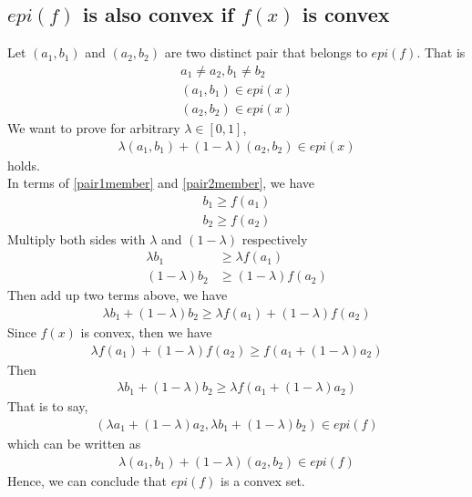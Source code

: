 \documentclass[11pt,a4paper]{article}
\begin{document}
\subsection{$epi(f)$ is also convex if $f(x)$ is convex}
Let $(a_1, b_1)$ and $(a_2, b_2)$ are two distinct pair that belongs to
$epi(f)$. That is 
\begin{align}
    a_1 \not = a_2 , b_1 \not = b_2 \\
    (a_1, b_1) \in epi(x) \label{pair1member} \\
    (a_2, b_2) \in epi(x) \label{pair2member}
\end{align}
We want to prove for arbitrary $\lambda \in [0, 1]$, 
\begin{align}
    \lambda(a_1, b_1) + (1-\lambda)(a_2, b_2) \in epi(x)
\end{align}
holds. \\
In terms of \eqref{pair1member} and \eqref{pair2member}, we have
\begin{align}
    b_1 \geq f(a_1) \\
    b_2 \geq f(a_2) 
\end{align}
Multiply both sides with $\lambda$ and $(1-\lambda)$ respectively
\begin{align}
    \lambda b_1 &\geq \lambda f(a_1) \\
    (1-\lambda) b_2 &\geq (1-\lambda) f(a_2) 
\end{align}
Then add up two terms above, we have
\begin{align}
    \lambda b_1 + (1-\lambda) b_2 \geq \lambda f(a_1) + (1-\lambda) f(a_2) 
\end{align}
Since $f(x)$ is convex, then we have
\begin{align}
    \lambda f(a_1) + (1-\lambda) f(a_2) \geq f (a_1 + (1-\lambda) a_2)
\end{align}
Then
\begin{align}
    \lambda b_1 + (1-\lambda) b_2 \geq \lambda f (a_1 + (1-\lambda) a_2)
\end{align}
That is to say,
\begin{align}
    (\lambda a_1 + (1-\lambda) a_2, \lambda b_1 + (1-\lambda) b_2) \in epi (f)
\end{align}
which can be written as 
\begin{align}
    \lambda(a_1, b_1) + (1-\lambda)(a_2, b_2) \in epi(f)
\end{align}
Hence, we can conclude that $epi(f)$ is a convex set.

\newpage
\end{document}
